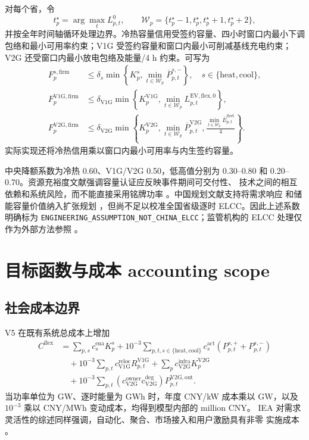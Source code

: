 \documentclass[UTF8,fontset=fandol,12pt]{ctexart}
\newcommand{\status}[1]{\nolinkurl{#1}}
\begin{document}
对每个省，令
\begin{equation}
  t^\star_p=\arg\max_t L^0_{p,t},\qquad
  \mathcal W_p=\{t^\star_p-1,t^\star_p,t^\star_p+1,t^\star_p+2\},
\end{equation}
并按全年时间轴循环处理边界。冷热容量信用受签约容量、四小时窗口内最小下调
包络和最小可用率约束；V1G 受签约容量和窗口内最小可削减基线充电约束；
V2G 还受窗口内最小放电包络及能量/4 h 约束。可写为
\begin{align}
 F^{s,\mathrm{firm}}_p
 &\le
 \delta_s\min\left\{
 K^s_p,
 \min_{t\in\mathcal W_p}\overline P^{s,-}_{p,t}
 \right\},
 \quad s\in\{\mathrm{heat},\mathrm{cool}\},\\
 F^{\mathrm{V1G},\mathrm{firm}}_p
 &\le
 \delta_{\mathrm{V1G}}\min\left\{
 K^{\mathrm{V1G}}_p,
 \min_{t\in\mathcal W_p}L^{\mathrm{EV,flex},0}_{p,t}
 \right\},\\
 F^{\mathrm{V2G},\mathrm{firm}}_p
 &\le
 \delta_{\mathrm{V2G}}\min\left\{
 K^{\mathrm{V2G}}_p,
 \min_{t\in\mathcal W_p}\overline P^{\mathrm{V2G}}_{p,t},
 \frac{\min_{t\in\mathcal W_p}\overline E^{\mathrm{fleet}}_{p,t}}{4}
 \right\}.
 \label{eq:firm}
\end{align}
实际实现还将冷热信用乘以窗口内最小可用率与内生签约容量。

中央降额系数为冷热 0.60、V1G/V2G 0.50，低高值分别为
0.30--0.80 和 0.20--0.70。资源充裕度文献强调容量认证应反映事件期间可交付性、
技术之间的相互依赖和系统风险，而不能直接采用铭牌功率
\cite{NREL2024RA,ESIG2023Capacity,Mantegna2024RA}。中国规划文献支持将需求响应
和储能容量价值纳入扩张规划
\cite{Huang2023DRCapacity}，但尚不足以校准全国省级逐时 ELCC。因此上述系数
明确标为 \status{ENGINEERING_ASSUMPTION_NOT_CHINA_ELCC}；监管机构的 ELCC
处理仅作为外部方法参照
\cite{CPUC2026IRP}。

\section{目标函数与成本 accounting scope}

\subsection{社会成本边界}

V5 在既有系统总成本上增加
\begin{align}
 C^{\mathrm{flex}}
 &=
 \sum_{p,s}c^{\mathrm{ena}}_s K^s_p
 +10^{-3}\sum_{p,t,s\in\{\mathrm{heat},\mathrm{cool}\}}
 c^{\mathrm{act}}_s
 \left(P^{s,+}_{p,t}+P^{s,-}_{p,t}\right) \nonumber\\
 &\quad
 +10^{-3}\sum_{p,t}c^{\mathrm{reloc}}_{\mathrm{V1G}}
 R^{\mathrm{V1G}}_{p,t}
 +\sum_p c^{\mathrm{infra}}_{\mathrm{V2G}}K^{\mathrm{V2G}}_p \nonumber\\
 &\quad
 +10^{-3}\sum_{p,t}
 \left(c^{\mathrm{owner}}_{\mathrm{V2G}}
 c^{\mathrm{deg}}_{\mathrm{V2G}}\right)
 P^{\mathrm{V2G,out}}_{p,t}.
 \label{eq:flexcost}
\end{align}
当功率单位为 GW、逐时能量为 GWh 时，年度 CNY/kW 成本乘以 GW，以及
$10^{-3}$ 乘以 CNY/MWh 变动成本，均得到模型内部的 million CNY。
IEA 对需求灵活性的综述同样强调，自动化、聚合、市场接入和用户激励具有非零
实施成本
\cite{IEADemandFlex2025}。
\end{document}
